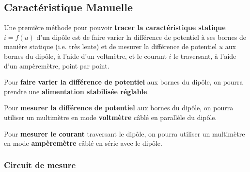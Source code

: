 \subsection*{Caractéristique Manuelle}

Une première méthode pour pouvoir \textbf{tracer la caractéristique statique} $i=f(u)$ d'un dipôle est de faire varier la différence de potentiel à ses bornes de manière statique (i.e. très lente) et de mesurer la différence de potentiel $u$ aux bornes du dipôle, à l'aide d'un voltmètre, et le courant $i$ le traversant, à l'aide d'un ampèremètre, point par point.

\medskip

Pour \textbf{faire varier la différence de potentiel} aux bornes du dipôle, on pourra prendre une \textbf{alimentation stabilisée réglable}.

Pour \textbf{mesurer la différence de potentiel} aux bornes du dipôle, on pourra utiliser un multimètre en mode \textbf{voltmètre} câblé en parallèle du dipôle.

Pour \textbf{mesurer le courant} traversant le dipôle, on pourra utiliser un multimètre en mode \textbf{ampèremètre} câblé en série avec le dipôle.

\subsubsection*{Circuit de mesure}

